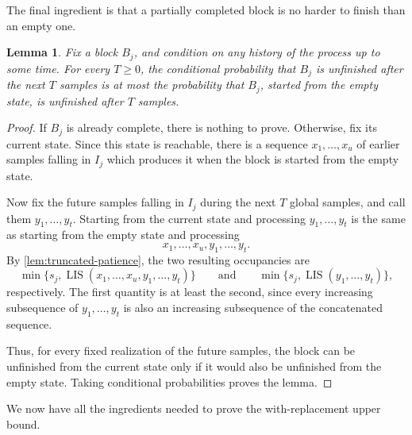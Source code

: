\documentclass[11pt,reqno,letterpaper]{amsart}
\newtheorem{lemma}[theorem]{Lemma}
\theoremstyle{definition}
\numberwithin{equation}{section}
\DeclareMathOperator{\LIS}{LIS}
\begin{document}
The final ingredient is that a partially completed block is no harder to finish than an empty one.

\begin{lemma}
\label{lem:fresh-phase}
Fix a block \(B_j\), and condition on any history of the process up to some time. For every \(T\ge0\), the conditional probability that \(B_j\) is unfinished after the next \(T\) samples is at most the probability that \(B_j\), started from the empty state, is unfinished after \(T\) samples.
\end{lemma}

\begin{proof}
If \(B_j\) is already complete, there is nothing to prove. Otherwise, fix its current state. Since this state is reachable, there is a sequence \(x_1,\dots,x_u\) of earlier samples falling in \(I_j\) which produces it when the block is started from the empty state.

Now fix the future samples falling in \(I_j\) during the next \(T\) global samples, and call them \(y_1,\dots,y_t\). Starting from the current state and processing \(y_1,\dots,y_t\) is the same as starting from the empty state and processing
\[
x_1,\dots,x_u,y_1,\dots,y_t.
\]
By \cref{lem:truncated-patience}, the two resulting occupancies are
\[
\min\{s_j,\LIS(x_1,\dots,x_u,y_1,\dots,y_t)\}
\qquad\text{and}\qquad
\min\{s_j,\LIS(y_1,\dots,y_t)\},
\]
respectively. The first quantity is at least the second, since every increasing subsequence of \(y_1,\dots,y_t\) is also an increasing subsequence of the concatenated sequence.

Thus, for every fixed realization of the future samples, the block can be unfinished from the current state only if it would also be unfinished from the empty state. Taking conditional probabilities proves the lemma.
\end{proof}

We now have all the ingredients needed to prove the with-replacement upper bound. 
\end{document}

